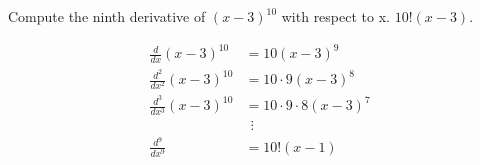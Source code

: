   {Compute the ninth derivative of $ (x-3)^{10} $ with respect to x.}
  {$ 10!(x-3) $.}
  
  \begin{align*}
    \frac{d}{dx} (x-3)^{10}
      &= 10(x-3)^9 \\
    \frac{d^2}{dx^2} (x-3)^{10}
      &= 10 \cdot 9 (x-3)^{8} \\
    \frac{d^3}{dx^3} (x-3)^{10}
      &= 10 \cdot 9 \cdot 8 (x-3)^{7} \\
      &\;\,\vdots \\
    \frac{d^9}{dx^9}
      &= 10!(x-1)
  \end{align*}
  
